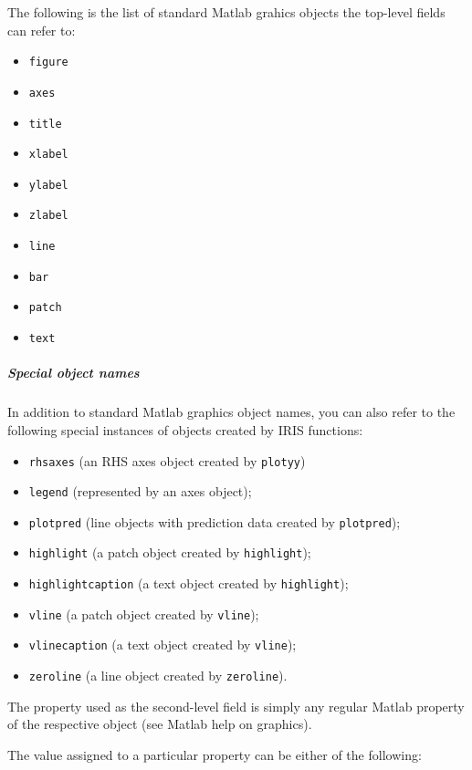The following is the list of standard Matlab grahics objects the
top-level fields can refer to:

\begin{itemize}
\itemsep1pt\parskip0pt
\item
  \texttt{figure}
\item
  \texttt{axes}
\item
  \texttt{title}
\item
  \texttt{xlabel}
\item
  \texttt{ylabel}
\item
  \texttt{zlabel}
\item
  \texttt{line}
\item
  \texttt{bar}
\item
  \texttt{patch}
\item
  \texttt{text}
\end{itemize}

\subparagraph{Special object names}

In addition to standard Matlab graphics object names, you can also refer
to the following special instances of objects created by IRIS functions:

\begin{itemize}
\itemsep1pt\parskip0pt
\item
  \texttt{rhsaxes} (an RHS axes object created by \texttt{plotyy})
\item
  \texttt{legend} (represented by an axes object);
\item
  \texttt{plotpred} (line objects with prediction data created by
  \texttt{plotpred});
\item
  \texttt{highlight} (a patch object created by \texttt{highlight});
\item
  \texttt{highlightcaption} (a text object created by
  \texttt{highlight});
\item
  \texttt{vline} (a patch object created by \texttt{vline});
\item
  \texttt{vlinecaption} (a text object created by \texttt{vline});
\item
  \texttt{zeroline} (a line object created by \texttt{zeroline}).
\end{itemize}

The property used as the second-level field is simply any regular Matlab
property of the respective object (see Matlab help on graphics).

The value assigned to a particular property can be either of the
following:

